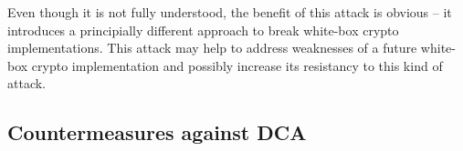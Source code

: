 Even though it is not fully understood, the benefit of this attack is obvious -- it introduces a principially different approach to break white-box crypto implementations. This attack may help to address weaknesses of a future white-box crypto implementation and possibly increase its resistancy to this kind of attack.

\subsection{Countermeasures against DCA}

